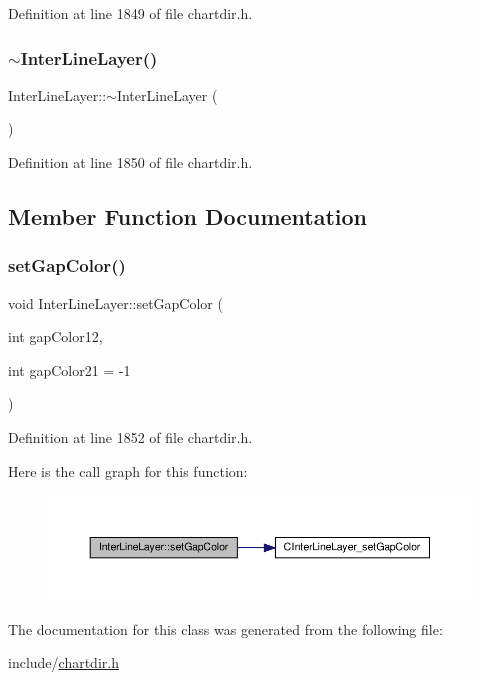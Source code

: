 Definition at line 1849 of file chartdir.\+h.

\mbox{\label{class_inter_line_layer_a27370c8966c328b177b32aae6c0a497b}} 
\subsubsection{\texorpdfstring{$\sim$\+Inter\+Line\+Layer()}{~InterLineLayer()}}
{\footnotesize\ttfamily Inter\+Line\+Layer\+::$\sim$\+Inter\+Line\+Layer (\begin{DoxyParamCaption}{ }\end{DoxyParamCaption})\hspace{0.3cm}{\ttfamily [inline]}}



Definition at line 1850 of file chartdir.\+h.



\subsection{Member Function Documentation}
\mbox{\label{class_inter_line_layer_af28ea4acbbed5cab5da8f61acc420a45}} 
\subsubsection{\texorpdfstring{set\+Gap\+Color()}{setGapColor()}}
{\footnotesize\ttfamily void Inter\+Line\+Layer\+::set\+Gap\+Color (\begin{DoxyParamCaption}\item[{int}]{gap\+Color12,  }\item[{int}]{gap\+Color21 = {\ttfamily -\/1} }\end{DoxyParamCaption})\hspace{0.3cm}{\ttfamily [inline]}}



Definition at line 1852 of file chartdir.\+h.

Here is the call graph for this function\+:
\nopagebreak
\begin{figure}[H]
\begin{center}
\leavevmode
\includegraphics[width=350pt]{class_inter_line_layer_af28ea4acbbed5cab5da8f61acc420a45_cgraph}
\end{center}
\end{figure}


The documentation for this class was generated from the following file\+:\begin{DoxyCompactItemize}
\item 
include/\hyperlink{chartdir_8h}{chartdir.\+h}\end{DoxyCompactItemize}
